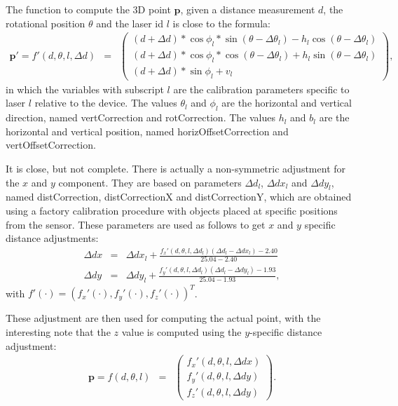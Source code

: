 \documentclass[english]{article}
\begin{document}
The function to compute the 3D point $\mathbf{p}$, given a distance measurement $d$,
the rotational position $\theta$ and the laser id $l$ is close to
the formula:
\begin{eqnarray}
  \mathbf{p'} =
  f'(d, \theta, l, \Delta d) &=& \left(
           \begin{array}{l}
             (d + \Delta d) * \cos{\phi_l} * \sin(\theta - \Delta \theta_l) - h_l \cos(\theta - \Delta \theta_l) \\
             (d + \Delta d) * \cos{\phi_l} * \cos(\theta - \Delta \theta_l) + h_l \sin(\theta - \Delta \theta_l) \\
             (d + \Delta d) * \sin{\phi_l} + v_l
           \end{array}
         \right),
  \label{eq:ptilde}
\end{eqnarray}
in which the variables with subscript $l$ are the calibration parameters
specific to laser $l$ relative to the device. The values $\theta_l$ and
$\phi_l$ are the horizontal and vertical direction, named vertCorrection
and rotCorrection. The values $h_l$ and $b_l$ are the horizontal and
vertical position, named horizOffsetCorrection and vertOffsetCorrection.

It is close, but not complete. There is actually a non-symmetric adjustment
for the $x$ and $y$ component. They are based on parameters $\Delta
d_l$, $\Delta dx_l$ and $\Delta dy_l$, named distCorrection,
distCorrectionX and distCorrectionY, which are obtained using a factory
calibration procedure with objects placed at specific positions from the
sensor.  These parameters are used as follows to get $x$ and $y$
specific distance adjustments:
\begin{eqnarray}
  \Delta dx &=& \Delta dx_l + \frac{f_x'(d, \theta, l, \Delta d_l)(\Delta d_l - \Delta dx_l) - 2.40}{25.04 - 2.40}  \label{eq:ddx} \\
  \Delta dy &=& \Delta dy_l + \frac{f_y'(d, \theta, l, \Delta d_l)(\Delta d_l - \Delta dy_l) - 1.93}{25.04 - 1.93}, \label{eq:ddy}
\end{eqnarray}
with $f'(\cdot) = \left(f_x'(\cdot) , f_y'(\cdot) , f_z'(\cdot) \right)^T$.

These adjustment are then used for computing the actual point, with the
interesting note that the $z$ value is computed using the $y$-specific
distance adjustment:
\begin{eqnarray}
  \mathbf{p} =
  f(d, \theta, l) &=& \left(
           \begin{array}{l}
              f_x'(d, \theta, l, \Delta dx) \\
              f_y'(d, \theta, l, \Delta dy) \\
              f_z'(d, \theta, l, \Delta dy)
           \end{array}
         \right).
  \label{eq:p}
\end{eqnarray}
\end{document}
